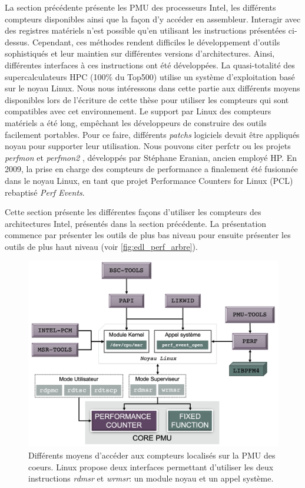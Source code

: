     
        La section précédente présente les PMU des processeurs Intel, les différents compteurs disponibles ainsi que la façon d'y accéder en assembleur. Interagir avec des registres matériels n'est possible qu'en utilisant les instructions présentées ci-dessus. Cependant, ces méthodes rendent difficiles le développement d'outils sophistiqués et leur maintien sur différentes versions d'architectures. Ainsi, différentes interfaces à ces instructions ont été développées. La quasi-totalité des supercalculateurs HPC (100\% du Top500) utilise un système d'exploitation basé sur le noyau Linux. Nous nous intéressons dans cette partie aux différents moyens disponibles lors de l'écriture de cette thèse pour utiliser les compteurs qui sont compatibles avec cet environnement. Le support par Linux des compteurs matériels a été long, empêchant les développeurs de construire des outils facilement portables. Pour ce faire, différents \textit{patchs} logiciels devait être appliqués noyau pour supporter leur utilisation. Nous pouvons citer perfctr \cite{Pettersson2005} ou les projets \textit{perfmon} et \textit{perfmon2} \cite{Eranian2006}, développés par Stéphane Eranian, ancien employé HP. En 2009, la prise en charge des compteurs de performance a finalement été fusionnée dans le noyau Linux, en tant que projet Performance Counters for Linux (PCL) rebaptisé \textit{Perf Events}.

    
        Cette section présente les différentes façons d'utiliser les compteurs des architectures Intel, présentés dans la section précédente. La présentation commence par présenter les outils de plus bas niveau pour ensuite présenter les outils de plus haut niveau (voir \autoref{fig:edl_perf_arbre}).
        
          
            \begin{figure}[h]
            \center
            \includegraphics[width=14cm]{images/edl_perf_arbre.png}
            \caption{\label{fig:edl_perf_arbre} Différents moyens d'accéder aux compteurs localisés sur la PMU des coeurs. Linux propose deux interfaces permettant d'utiliser les deux instructions \textit{rdmsr} et \textit{wrmsr}: un module noyau et un appel système.}
            \end{figure}
 
